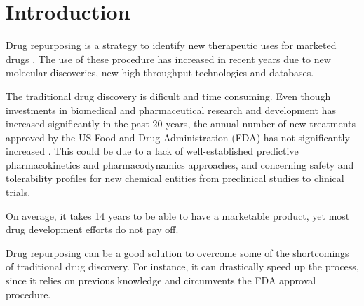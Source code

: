 \documentclass[fleqn,10pt]{SelfArx} %
\affiliation{\textsuperscript{1}\textit{Quantitative and Computational Biology Master, University of Trento, Italy}}
\affiliation{{\small$^{^\wedge}$}\textit{Equal contributions}}
\begin{document}
\flushbottom %

\maketitle %

\tableofcontents %

\thispagestyle{empty} %


\section*{Introduction} %


Drug repurposing is a strategy to identify new therapeutic uses for marketed drugs \cite{Polamreddy}. The use of these procedure has increased in recent years due to new molecular discoveries, new high-throughput technologies and databases. 

The traditional drug discovery is dificult and time consuming. Even though investments in biomedical and pharmaceutical research and development has increased significantly in the past 20 years, the annual number of new treatments approved by the US Food and Drug Administration (FDA) has not significantly increased \cite{Feixiong}. This could be due to a lack of well-established  predictive pharmacokinetics and pharmacodynamics approaches, and concerning safety and tolerability profiles for new chemical entities from preclinical studies to clinical trials\cite{Shih}. 

On average, it takes 14 years to be able to have a marketable product, yet most drug development efforts do not pay off.

Drug repurposing can be a good solution to overcome some of the shortcomings of traditional drug discovery. For instance, it can drastically speed up the process, since it relies on previous knowledge and circumvents the FDA approval procedure.
\end{document}
